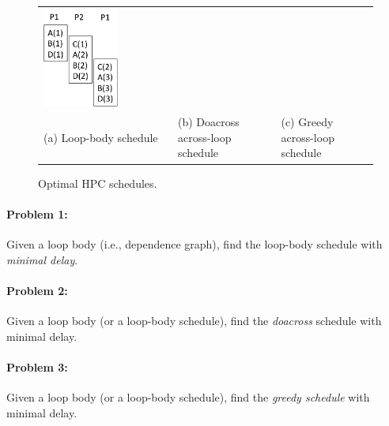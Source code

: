 \documentclass[sigconf, screen, natbib=false, dvipsnames, table]{acmart}
\theoremstyle{definition}
\begin{document}
\begin{figure}[tbhp]
\begin{tabular}{lll}
\begin{minipage}[b]{4.25cm}
\includegraphics[width=0.6\textwidth]{figs/HPCgreedyLoop.pdf}
\end{minipage}

\\

(a) Loop-body schedule
&
(b) Doacross across-loop schedule
& 
(c) Greedy across-loop schedule

\end{tabular}
\caption{Optimal HPC schedules.}
\label{fig:HPCexample}\vspace{-2ex}
\end{figure}


\paragraph{Problem 1:} Given a loop body (i.e., dependence graph), find the loop-body schedule with \emph{minimal delay}. 

\paragraph{Problem 2:} Given a loop body (or a loop-body schedule), find the \emph{doacross} schedule with minimal delay.

\paragraph{Problem 3:} Given a loop body (or a loop-body schedule), find the \emph{greedy schedule} with minimal delay.
\end{document}
